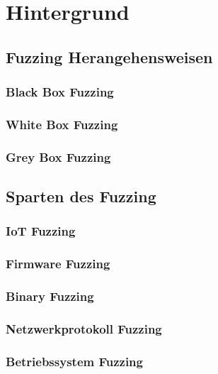 
\section{Hintergrund}\label{sec:hintergrund}
\subsection{Fuzzing Herangehensweisen}\label{subsec:testing-methoden}
\subsubsection{Black Box Fuzzing}
\subsubsection{White Box Fuzzing}
\subsubsection{Grey Box Fuzzing}

\subsection{Sparten des Fuzzing}\label{subsec:sparten-des-fuzzing}
\subsubsection{IoT Fuzzing}
\subsubsection{Firmware Fuzzing}
\subsubsection{Binary Fuzzing}
\subsubsection{Netzwerkprotokoll Fuzzing}
\subsubsection{Betriebssystem Fuzzing}
